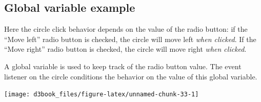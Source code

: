 \documentclass[openany]{book}
\begin{document}
\hypertarget{global-variable-example}{%
\subsection{Global variable example}\label{global-variable-example}}

Here the circle click behavior depends on the value of the radio button: if the ``Move left'' radio button is checked, the circle will move left \emph{when clicked}. If the ``Move right'' radio button is checked, the circle will move right \emph{when clicked}.

A global variable is used to keep track of the radio button value. The event listener on the circle conditions the behavior on the value of this global variable.

\texttt{[image: d3book\_files/figure-latex/unnamed-chunk-33-1]}
\end{document}
